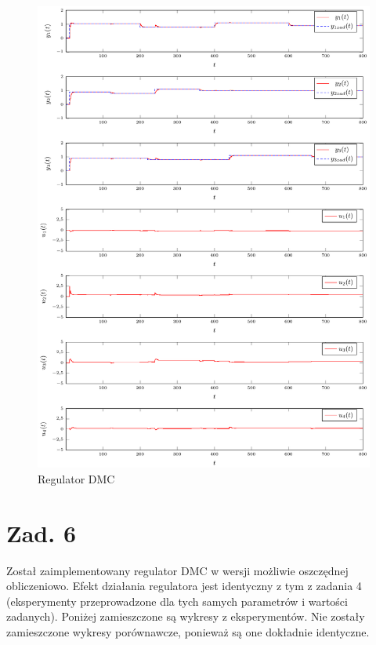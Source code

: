 \documentclass[a4paper,titlepage,11pt,twosides,floatssmall]{mwrep}
\begin{document}
\begin{figure}[H]
	\centering
	\includegraphics[scale=1]{../wykresy/zad5_dmc.pdf}
	\caption{Regulator DMC}
\end{figure}



\chapter*{Zad. 6}

Został zaimplementowany regulator DMC w wersji możliwie oszczędnej obliczeniowo. Efekt działania regulatora jest identyczny z tym z zadania 4 (eksperymenty przeprowadzone dla tych samych parametrów i wartości zadanych). Poniżej zamieszczone są wykresy z eksperymentów. Nie zostały zamieszczone wykresy porównawcze, ponieważ są one dokładnie identyczne.
\end{document}
